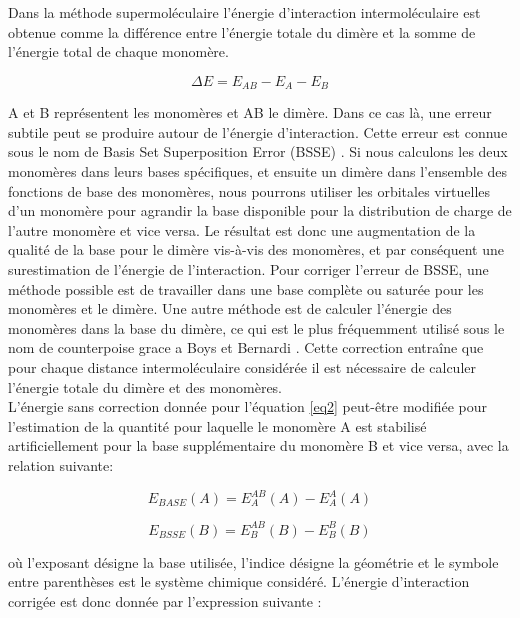 Dans la méthode supermoléculaire l’énergie d’interaction intermoléculaire est obtenue comme la différence entre l’énergie totale du dimère et la somme de l’énergie total de chaque monomère.

\begin{equation}
\Delta E = E_{AB} - E_{A} - E_{B} \label{eq2}
\end{equation}

A et B représentent les monomères et AB le dimère. Dans ce cas là, une erreur subtile peut se produire autour de l’énergie d’interaction. Cette erreur est connue sous le nom de Basis Set Superposition Error (BSSE) \cite{sherrill2010counterpoise}. Si nous calculons les deux monomères dans leurs bases spécifiques, et ensuite un dimère dans l’ensemble des fonctions de base des monomères, nous pourrons utiliser les orbitales virtuelles d’un monomère pour agrandir la base disponible pour la distribution de charge de l’autre monomère et vice versa. Le résultat est donc une augmentation de la qualité de la base pour le dimère vis-à-vis des monomères, et par conséquent une surestimation de l’énergie de l’interaction. Pour corriger l’erreur de BSSE, une méthode possible est de travailler dans une base complète ou saturée pour les monomères et le dimère. Une autre méthode est de calculer l’énergie des monomères dans la base du dimère, ce qui est le plus fréquemment utilisé sous le nom de counterpoise grace a Boys et Bernardi \cite{boys1970calculation}. Cette correction entraîne que pour chaque distance intermoléculaire considérée il est nécessaire de calculer l’énergie totale du dimère et des monomères.\\

L’énergie sans correction donnée pour l’équation \ref{eq2}  peut-être modifiée pour l'estimation de la quantité pour laquelle le monomère A est stabilisé artificiellement pour la base supplémentaire du monomère B et vice versa, avec la relation suivante:

\begin{equation}
E_{BASE}(A) = E_{A}^{AB}(A) - E_{A}^{A}(A)
\end{equation}

\begin{equation}
E_{BSSE}(B) = E_{B}^{AB}(B) - E_{B}^{B}(B)
\end{equation}

où l'exposant désigne la base utilisée, l'indice désigne la géométrie et le symbole entre parenthèses est le système chimique considéré.
L'énergie d'interaction corrigée est donc donnée par l'expression suivante :

